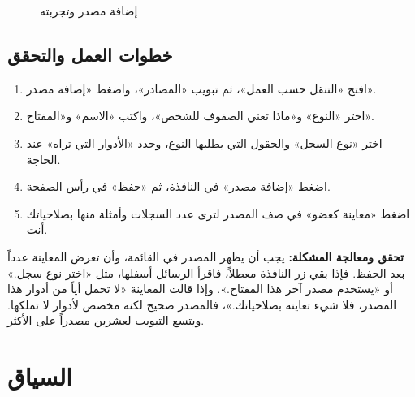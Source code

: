 \begin{figure}[H]
\centering
{}
\rclegend
\caption{إضافة مصدر وتجربته}
\label{fig:builder-work-navigation-sources-flow}
\end{figure}

\subsection{خطوات العمل والتحقق}
\begin{enumerate}
\item افتح «التنقل حسب العمل»، ثم تبويب «المصادر»، واضغط «إضافة مصدر».
\item اختر «النوع» و«ماذا تعني الصفوف للشخص»، واكتب «الاسم» و«المفتاح».
\item اختر «نوع السجل» والحقول التي يطلبها النوع، وحدد «الأدوار التي تراه» عند الحاجة.
\item اضغط «إضافة مصدر» في النافذة، ثم «حفظ» في رأس الصفحة.
\item اضغط «معاينة كعضو» في صف المصدر لترى عدد السجلات وأمثلة منها بصلاحياتك أنت.
\end{enumerate}

\textbf{تحقق ومعالجة المشكلة:} يجب أن يظهر المصدر في القائمة، وأن تعرض المعاينة عدداً بعد الحفظ. فإذا بقي زر النافذة معطلاً، فاقرأ الرسائل أسفلها، مثل «اختر نوع سجل.» أو «يستخدم مصدر آخر هذا المفتاح.». وإذا قالت المعاينة «لا تحمل أياً من أدوار هذا المصدر، فلا شيء تعاينه بصلاحياتك.»، فالمصدر صحيح لكنه مخصص لأدوار لا تملكها. ويتسع التبويب لعشرين مصدراً على الأكثر.

\clearpage
\section{السياق}
\label{sec:builder-feature-work-navigation-context}

